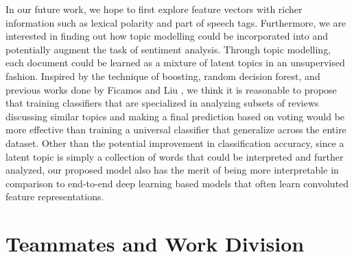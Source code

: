 \documentclass{article}
\begin{document}
In our future work, we hope to first explore feature vectors with richer information such as lexical polarity and part of speech tags. Furthermore, we are interested in finding out how topic modelling could be incorporated into and potentially augment the task of sentiment analysis. Through topic modelling, each document could be learned as a mixture of latent topics in an unsupervised fashion. Inspired by the technique of boosting, random decision forest, and previous works done by Ficamos and Liu \cite{Ficamos}, we think it is reasonable to propose that training classifiers that are specialized in analyzing subsets of reviews discussing similar topics and making a final prediction based on voting would be more effective than training a universal classifier that generalize across the entire dataset. Other than the potential improvement in classification accuracy, since a latent topic is simply a collection of words that could be interpreted and further analyzed, our proposed model also has the merit of being more interpretable in comparison to end-to-end deep learning based models that often learn convoluted feature representations. 


\section{Teammates and Work Division}
\end{document}
